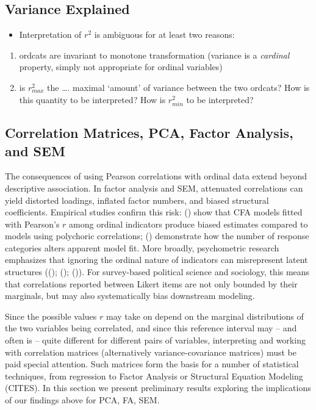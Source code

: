 \documentclass[
  12pt,
]{article}
\providecommand{\tightlist}{%
  \setlength{\itemsep}{0pt}\setlength{\parskip}{0pt}}
\theoremstyle{plain}
\theoremstyle{definition}
\theoremstyle{remark}
\begin{document}
\subsection{Variance Explained}\label{variance-explained}

\begin{itemize}
\tightlist
\item
  Interpretation of \(r^2\) is ambiguous for at least two reasons:
\end{itemize}

\begin{enumerate}
\def\labelenumi{\arabic{enumi}.}
\tightlist
\item
  ordcats are invariant to monotone transformation (variance is a
  \emph{cardinal} property, simply not appropriate for ordinal
  variables)
\item
  is \(r^2_{max}\) the \ldots. maximal `amount' of variance between the
  two ordcats? How is this quantity to be interpreted? How is
  \(r^2_{min}\) to be interpreted?
\end{enumerate}

\subsection{Correlation Matrices, PCA, Factor Analysis, and
SEM}\label{sec-matrices}

The consequences of using Pearson correlations with ordinal data extend
beyond descriptive association. In factor analysis and SEM, attenuated
correlations can yield distorted loadings, inflated factor numbers, and
biased structural coefficients. Empirical studies confirm this risk:
() show that CFA
models fitted with Pearson's \(r\) among ordinal indicators produce
biased estimates compared to models using polychoric correlations;
() demonstrate how the
number of response categories alters apparent model fit. More broadly,
psychometric research emphasizes that ignoring the ordinal nature of
indicators can misrepresent latent structures
(();
();
()). For
survey-based political science and sociology, this means that
correlations reported between Likert items are not only bounded by their
marginals, but may also systematically bias downstream modeling.

Since the possible values \(r\) may take on depend on the marginal
distributions of the two variables being correlated, and since this
reference interval may -- and often is -- quite different for different
pairs of variables, interpreting and working with correlation matrices
(alternatively variance-covariance matrices) must be paid special
attention. Such matrices form the basis for a number of statistical
techniques, from regression to Factor Analysis or Structural Equation
Modeling (CITES). In this section we present preliminary results
exploring the implications of our findings above for PCA, FA, SEM.
\end{document}
